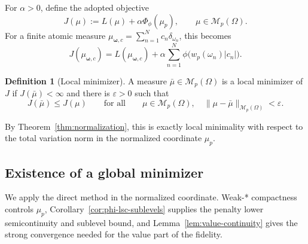 \documentclass[11pt]{amsart}
\theoremstyle{definition}
\newtheorem{definition}[theorem]{Definition}
\theoremstyle{remark}
\begin{document}
For $\alpha>0$, define the adopted objective
\begin{equation*}
	J(\mu):=
	L(\mu)+\alpha\Phi_\phi(\mu_p),
	\qquad \mu\in\mathcal M_p(\Omega).
\end{equation*}
For a finite atomic measure
$\mu_{\boldsymbol\omega,c}=\sum_{n=1}^Nc_n\delta_{\omega_n}$, this becomes
\begin{equation*}
	J(\mu_{\boldsymbol\omega,c})
	=L(\mu_{\boldsymbol\omega,c})
	+\alpha\sum_{n=1}^N
	\phi\bigl(w_p(\omega_n)|c_n|\bigr).
\end{equation*}

\begin{definition}[Local minimizer]
\label{def:local_min}
A measure $\bar\mu\in\mathcal M_p(\Omega)$ is a local minimizer of $J$ if
$J(\bar\mu)<\infty$ and there is $\varepsilon>0$ such that
\begin{equation*}
	J(\bar\mu)\le J(\mu)
	\qquad\text{for all}\qquad
	\mu\in\mathcal M_p(\Omega),\quad
		\|\mu-\bar\mu\|_{\mathcal M_p(\Omega)}<\varepsilon.
\end{equation*}
\end{definition}
By Theorem~\ref{thm:normalization}, this is exactly local minimality with
respect to the total variation norm in the normalized coordinate $\mu_p$.

\subsection{Existence of a global minimizer}
\label{sec:existence}
We apply the direct method in the normalized coordinate. Weak-* compactness
controls $\mu_p$, Corollary~\ref{cor:phi-lsc-sublevels} supplies the penalty
lower semicontinuity and sublevel bound, and
Lemma~\ref{lem:value-continuity} gives the strong convergence needed for the
value part of the fidelity.
\end{document}
